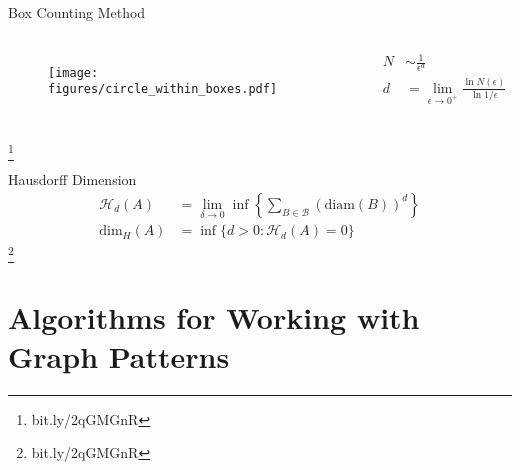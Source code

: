 \documentclass[10pt]{beamer}
\newcommand\blfootnote[1]{%
  \begingroup
  \renewcommand\thefootnote{}\footnote{#1}%
  \addtocounter{footnote}{-1}%
  \endgroup
}
\begin{document}
\begin{frame}{Box Counting Method}
    \begin{columns}[c]
        \column{1.5in}
        \begin{figure}[h!]
            \centering
            \texttt{[image: figures/circle\_within\_boxes.pdf]}
        \end{figure}
        \column{1.5in}
            \begin{align*}
                N &\sim \frac{1}{\epsilon^d} \\
                d &= \lim_{\epsilon \to 0^+} \frac{\ln N(\epsilon)}{\ln 1 / \epsilon}
            \end{align*}
    \end{columns}
    \blfootnote{bit.ly/2qGMGnR}
\end{frame}


\begin{frame}{Hausdorff Dimension}
    \begin{align*}
        \mathcal{H}_d (A) &= \lim_{\delta \to 0} \inf \left \{ \sum_{B \in \mathcal{B}} \left ( \text{diam}(B) \right)^d \right \} \\
        \text{dim}_H (A) &= \inf \{ d > 0 : \mathcal{H}_d (A) = 0 \}
    \end{align*}
    \blfootnote{bit.ly/2qGMGnR}
\end{frame}

\section{Algorithms for Working with Graph Patterns}
\end{document}
